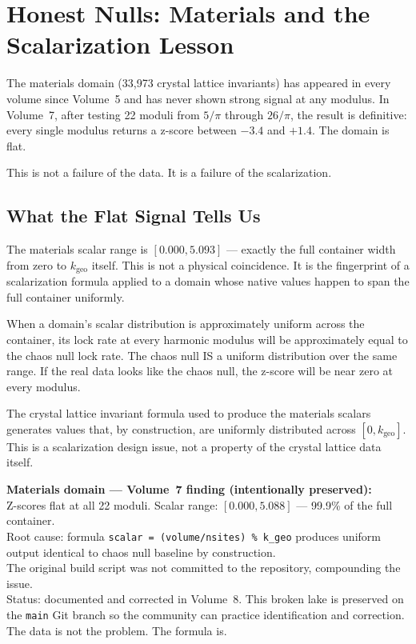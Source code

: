 \documentclass[11pt, letterpaper, openany]{book}
\begin{document}
\chapter{Honest Nulls: Materials and the Scalarization Lesson}

The materials domain (33,973 crystal lattice invariants) has appeared in every volume
since Volume~5 and has never shown strong signal at any modulus. In Volume~7, after
testing 22 moduli from $5/\pi$ through $26/\pi$, the result is definitive: every
single modulus returns a z-score between $-3.4$ and $+1.4$. The domain is flat.

This is not a failure of the data. It is a failure of the scalarization.

\section*{What the Flat Signal Tells Us}

The materials scalar range is $[0.000, 5.093]$ --- exactly the full container width
from zero to $k_\text{geo}$ itself. This is not a physical coincidence. It is the
fingerprint of a scalarization formula applied to a domain whose native values happen
to span the full container uniformly.

When a domain's scalar distribution is approximately uniform across the container, its
lock rate at every harmonic modulus will be approximately equal to the chaos null lock
rate. The chaos null IS a uniform distribution over the same range. If the real data
looks like the chaos null, the z-score will be near zero at every modulus.

The crystal lattice invariant formula used to produce the materials scalars generates
values that, by construction, are uniformly distributed across $[0, k_\text{geo}]$.
This is a scalarization design issue, not a property of the crystal lattice data
itself.

\begin{warningbox}
\textbf{Materials domain --- Volume~7 finding (intentionally preserved):}\\
Z-scores flat at all 22 moduli. Scalar range: $[0.000, 5.088]$ --- 99.9\% of the full container.\\
Root cause: formula \texttt{scalar = (volume/nsites) \% k\_geo} produces uniform output
identical to chaos null baseline by construction.\\
The original build script was not committed to the repository, compounding the issue.\\
Status: documented and corrected in Volume~8. This broken lake is preserved on the
\texttt{main} Git branch so the community can practice identification and correction.\\
The data is not the problem. The formula is.
\end{warningbox}
\end{document}
